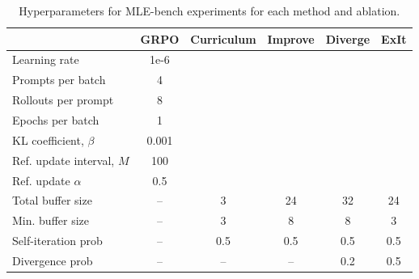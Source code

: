 \begin{table}[htb]
\footnotesize
\centering
\begin{tabular}{l|ccccc}
\toprule
 & \textbf{GRPO} & \textbf{Curriculum} & \textbf{Improve} & \textbf{Diverge} & \textbf{ExIt} \\
\midrule
Learning rate       & 1e-6 &  &  &  &  \\
Prompts per batch  & 4 &  &  & &  \\
Rollouts per prompt & 8 & &  & &  \\
Epochs per batch     & 1 & & & & \\
KL coefficient, $\beta$ & 0.001 & & & & \\
Ref. update interval, $M$ & 100 & & & & \\
Ref. update $\alpha$  & 0.5 & & & & \\
Total buffer size   & – & 3 & 24 & 32 & 24 \\
Min. buffer size    & – & 3 & 8 & 8 & 3 \\
Self-iteration prob & – & 0.5 & 0.5 & 0.5 & 0.5 \\
Divergence prob     & – & – & – & 0.2 & 0.5 \\
\bottomrule
\end{tabular}
\caption{Hyperparameters for MLE-bench experiments for each method and ablation.}
\label{tab:hyperparams_mlebench}
\end{table}
